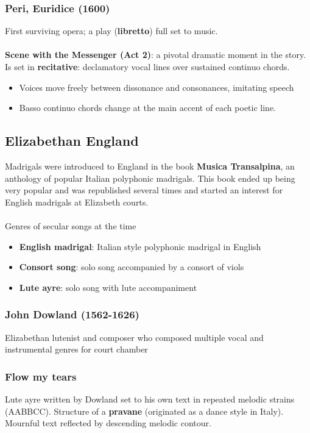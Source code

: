 \documentclass{article}
\begin{document}
  \subsubsection{Peri, Euridice (1600)}
  First surviving opera; a play (\textbf{libretto}) full set to music. \\ \\
  \textbf{Scene with the Messenger (Act 2)}: a pivotal dramatic moment in the story. Is set in \textbf{recitative}: declamatory vocal lines over sustained continuo chords.
  \begin{itemize}
    \item Voices move freely between dissonance and consonances, imitating speech
    \item Basso continuo chords change at the main accent of each poetic line.
  \end{itemize}
  \subsection{Elizabethan England}
  Madrigals were introduced to England in the book \textbf{Musica Transalpina}, an anthology of popular Italian polyphonic madrigals. This book ended up being very popular and was republished several times and started an interest for English madrigals at Elizabeth courts. \\ \\
  Genres of secular songs at the time
  \begin{itemize}
    \item \textbf{English madrigal}: Italian style polyphonic madrigal in English
    \item \textbf{Consort song}: solo song accompanied by a consort of viols
    \item \textbf{Lute ayre}: solo song with lute accompaniment
  \end{itemize}
  \subsubsection{John Dowland (1562-1626)}
  Elizabethan lutenist and composer who composed multiple vocal and instrumental genres for court chamber
  \subsubsection{Flow my tears}
  Lute ayre written by Dowland set to his own text in repeated melodic strains (AABBCC). Structure of a \textbf{pravane} (originated as a dance style in Italy). Mournful text reflected by descending melodic contour.
\end{document}
